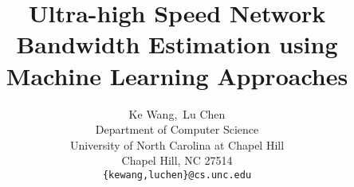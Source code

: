 \documentclass{article} %
\title{Ultra-high Speed Network Bandwidth Estimation using
Machine Learning Approaches}
\author{
{Ke Wang,~Lu Chen}\\
Department of Computer Science\\
University of North Carolina at Chapel Hill\\
Chapel Hill, NC 27514\\
\texttt{\{kewang,luchen\}@cs.unc.edu}
}
\begin{document}
\maketitle







\nocite{*}


\end{document}
